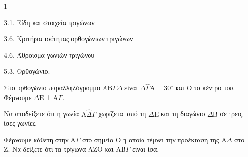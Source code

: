 \begin{ylh}{1}
    \item 3.1. Είδη και στοιχεία τριγώνων
    \item 3.6. Κριτήρια ισότητας ορθογώνιων τριγώνων
    \item 4.6. Άθροισμα γωνιών τριγώνου
    \item 5.3. Ορθογώνιο.
\end{ylh}
Στο ορθογώνιο παραλληλόγραμμο $\mathrm{A}\mathrm{B}\Gamma\Delta$ είναι $\Delta\hat{\Gamma}\mathrm{A} = 30^\circ$ και $\mathrm{O}$ το κέντρο του. Φέρνουμε $\Delta\mathrm{E} \perp \mathrm{A}\Gamma$.
\begin{alist}
    \item Να αποδείξετε ότι η γωνία $\mathrm{A}\hat{\Delta}\Gamma$ χωρίζεται από τη $\Delta\mathrm{E}$ και τη διαγώνιο $\Delta\mathrm{B}$ σε τρεις ίσες γωνίες. 
    \item Φέρνουμε κάθετη στην $\mathrm{A}\Gamma$ στο σημείο $\mathrm{O}$ η οποία τέμνει την προέκταση της $\mathrm{A}\Delta$ στο $\mathrm{Z}$. Να δείξετε ότι τα τρίγωνα $\mathrm{A}\mathrm{Z}\mathrm{O}$ και $\mathrm{A}\mathrm{B}\Gamma$ είναι ίσα. 
\end{alist}
